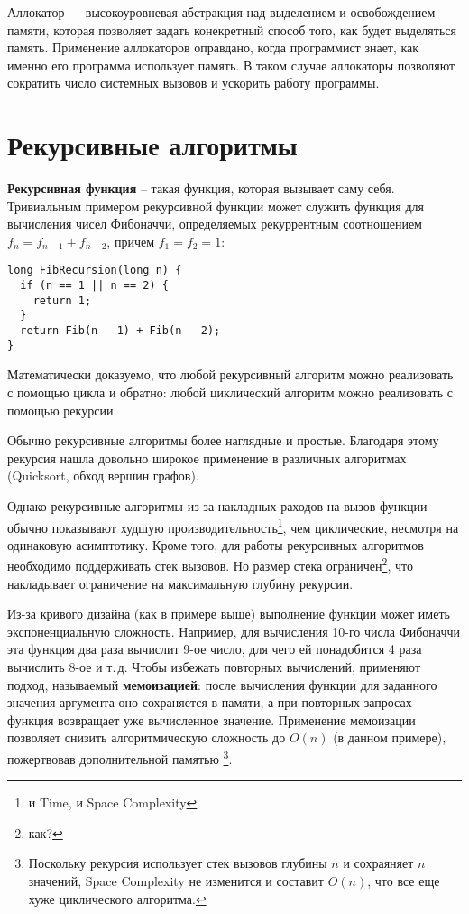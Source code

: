 \documentclass[14pt, a4paper]{extarticle}
\begin{document}
Аллокатор --- высокоуровневая абстракция над выделением и освобождением памяти,
которая позволяет задать конекретный способ того, как будет выделяться память.
Применение аллокаторов оправдано, когда программист знает, как именно его программа
использует память. В таком случае аллокаторы позволяют сократить число системных вызовов
и ускорить работу программы.

\section{Рекурсивные алгоритмы}
\textbf{Рекурсивная функция} -- такая функция, которая вызывает саму себя.
Тривиальным примером рекурсивной функции может служить функция для вычисления
чисел Фибоначчи, определяемых рекуррентным соотношением $f_n = f_{n-1} + f_{n-2}$, причем $f_1 = f_2 = 1$:
\begin{verbatim}
long FibRecursion(long n) {
  if (n == 1 || n == 2) {
    return 1;
  }
  return Fib(n - 1) + Fib(n - 2);
}  
\end{verbatim}

Математически доказуемо, что любой рекурсивный алгоритм можно реализовать с помощью цикла
и обратно: любой циклический алгоритм можно реализовать с помощью рекурсии.

Обычно рекурсивные алгоритмы более наглядные и простые. Благодаря этому рекурсия нашла довольно
широкое применение в различных алгоритмах (Quicksort, обход вершин графов).

Однако рекурсивные алгоритмы из-за накладных раходов на вызов функции обычно показывают худшую
производительность\footnote{и Time, и Space Complexity}, чем циклические, несмотря на одинаковую
асимптотику. Кроме того, для работы рекурсивных алгоритмов необходимо поддерживать стек вызовов.
Но размер стека ограничен\footnote{как?}, что накладывает ограничение на максимальную глубину рекурсии.

Из-за кривого дизайна (как в примере выше) выполнение функции может иметь
экспоненциальную сложность. Например, для вычисления 10-го числа Фибоначчи эта функция
два раза вычислит 9-ое число, для чего ей понадобится 4 раза вычислить 8-ое и т.\,д. Чтобы
избежать повторных вычислений, применяют подход, называемый \textbf{мемоизацией}: после вычисления
функции для заданного значения аргумента оно сохраняется в памяти, а при повторных запросах функция
возвращает уже вычисленное значение. Применение мемоизации позволяет снизить алгоритмическую сложность
до $O(n)$ (в данном примере), пожертвовав дополнительной памятью \footnote{Поскольку рекурсия использует
стек вызовов глубины $n$ и сохраяняет $n$ значений, Space Complexity не изменится и составит $O(n)$,
что все еще хуже циклического алгоритма.}.
\end{document}
